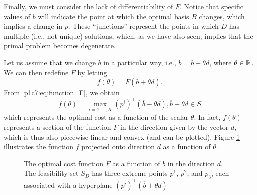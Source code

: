 Finally, we must consider the lack of differentiability of $F$. Notice that specific values of $b$ will indicate the point at which the optimal basis $B$ changes, which implies a change in $p$. These ``junctions'' represent the points in which $D$ has multiple (i.e., not unique) solutions, which, as we have also seen, implies that the primal problem becomes degenerate.

Let us assume that we change $b$ in a particular way, i.e., $b = \overline{b} + \theta d$, where $\theta \in \mathbb{R}$. We can then redefine $F$ by letting 
%
\begin{equation*}
	f(\theta) = F(\overline{b} + \theta d).
\end{equation*}
%
From \eqref{p1c7:eq:function_F}, we obtain
%
\begin{equation*}
	f(\theta) = \max_{i = 1, \dots, K} (p^i)^\top (\overline{b} - \theta d), \overline{b} + \theta d \in S
\end{equation*}
%
which represents the optimal cost as a function of the scalar $\theta$. In fact, $f(\theta)$ represents a section of the function $F$ in the direction given by the vector $d$, which is thus also piecewise linear and convex (and can be plotted). Figure \ref{p1c7:fig:b_function_theta} illustrates the function $f$ projected onto direction $d$ as a function of $\theta$.

\begin{figure}
	\caption{The optimal cost function $F$ as a function of $b$ in the direction $d$. The feasibility set $S_D$ has three extreme points $p^1$, $p^2$, and $p_3$, each associated with a hyperplane $(p^i)^\top(\overline{b} + \theta d)$} \label{p1c7:fig:b_function_theta}
\end{figure}

